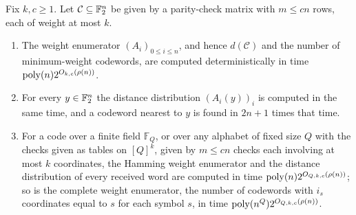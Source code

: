 \begin{theorem}\label{thm:codes}
Fix $k,c\ge1$. Let $\mathcal C\subseteq\mathbb{F}_2^n$ be given by a parity-check matrix
with $m\le cn$ rows, each of weight at most $k$.
\begin{enumerate}[label=\textup{(\roman*)},leftmargin=2.2em]
\item\label{it:wenum} The weight enumerator $(A_i)_{0\le i\le n}$, and hence
$d(\mathcal C)$ and the number of minimum-weight codewords, are computed
deterministically in time $\operatorname{poly}(n)2^{O_{k,c}(\rho(n))}$.
\item\label{it:coset} For every $y\in\mathbb{F}_2^n$ the distance distribution
$(A_i(y))_i$ is computed in the same time, and a codeword nearest to $y$ is
found in $2n+1$ times that time.
\item\label{it:qary} For a code over a finite field $\mathbb F_Q$, or over any
alphabet of fixed size $Q$ with the checks given as tables on $[Q]^{k}$, given by
$m\le cn$ checks each involving at most $k$ coordinates, the Hamming weight
enumerator and the distance distribution of every received word are computed
in time $\operatorname{poly}(n)2^{O_{Q,k,c}(\rho(n))}$; so is the complete weight enumerator,
the number of codewords with $i_s$ coordinates equal to $s$ for each symbol
$s$, in time $\operatorname{poly}(n^{Q})2^{O_{Q,k,c}(\rho(n))}$.
\end{enumerate}
\end{theorem}

